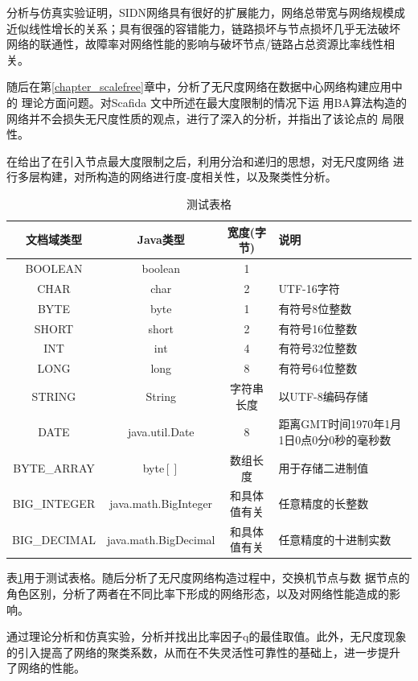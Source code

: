 \documentclass[master]{njuthesis}
\begin{document}
分析与仿真实验证明，SIDN网络具有很好的扩展能力，网络总带宽与网络规模成
近似线性增长的关系；具有很强的容错能力，链路损坏与节点损坏几乎无法破坏
网络的联通性，故障率对网络性能的影响与破坏节点/链路占总资源比率线性相关。

随后在第\ref{chapter_scalefree}章中，分析了无尺度网络在数据中心网络构建应用中的
理论方面问题。对Scafida \cite{gyarmati2010scafida}文中所述在最大度限制的情况下运
用BA算法构造的网络并不会损失无尺度性质的观点，进行了深入的分析，并指出了该论点的
局限性。

在给出了在引入节点最大度限制之后，利用分治和递归的思想，对无尺度网络
进行多层构建，对所构造的网络进行度-度相关性，以及聚类性分析。

\begin{table}
  \centering
  \begin{tabular}{cccp{38mm}}
    \toprule
    \textbf{文档域类型} & \textbf{Java类型} & \textbf{宽度(字节)} & \textbf{说明} \\
    \midrule
    BOOLEAN  & boolean &  1  & \\
    CHAR     & char    &  2  & UTF-16字符 \\
    BYTE     & byte    &  1  & 有符号8位整数 \\
    SHORT    & short   &  2  & 有符号16位整数 \\
    INT      & int     &  4  & 有符号32位整数 \\
    LONG     & long    &  8  & 有符号64位整数 \\
    STRING   & String  &  字符串长度  & 以UTF-8编码存储 \\
    DATE     & java.util.Date & 8 & 距离GMT时间1970年1月1日0点0分0秒的毫秒数 \\
    BYTE\_ARRAY & byte$[]$ & 数组长度 & 用于存储二进制值 \\
    BIG\_INTEGER & java.math.BigInteger & 和具体值有关 & 任意精度的长整数 \\
    BIG\_DECIMAL & java.math.BigDecimal & 和具体值有关 & 任意精度的十进制实数 \\
    \bottomrule
  \end{tabular}
  \caption{测试表格}\label{table:test5}
\end{table}

表\ref{table:test5}用于测试表格。随后分析了无尺度网络构造过程中，交换机节点与数
据节点的角色区别，分析了两者在不同比率下形成的网络形态，以及对网络性能造成的影响。

通过理论分析和仿真实验，分析并找出比率因子q的最佳取值。此外，无尺度现象
的引入提高了网络的聚类系数，从而在不失灵活性可靠性的基础上，进一步提升
了网络的性能。
\end{document}
